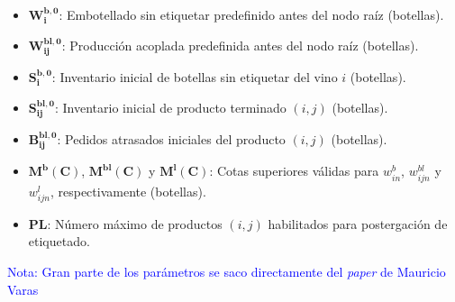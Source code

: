 \documentclass[11pt, letterpaper]{article}
\begin{document}
\begin{itemize}
    \item $\bm{W^{b,0}_i}$: Embotellado sin etiquetar predefinido
    antes del nodo raíz (botellas).
    
    \item $\bm{W^{bl,0}_{ij}}$: Producción acoplada predefinida
    antes del nodo raíz (botellas).
    
    \item $\bm{S^{b,0}_i}$: Inventario inicial de botellas sin etiquetar del vino $i$ (botellas).
    
    \item $\bm{S^{bl,0}_{ij}}$: Inventario inicial de producto
    terminado $(i,j)$ (botellas).
    
    \item $\bm{B^{bl,0}_{ij}}$: Pedidos atrasados iniciales del producto $(i,j)$ (botellas).

    \item $\bm{M^b(C)}$, $\bm{M^{bl}(C)}$ y $\bm{M^l(C)}$: Cotas superiores válidas para $w^b_{in}$, $w^{bl}_{ijn}$ y $w^l_{ijn}$,
    respectivamente (botellas).
    
    \item $\bm{PL}$: Número máximo de productos $(i,j)$ habilitados para postergación de etiquetado.
\end{itemize}

\textcolor{blue}{Nota: Gran parte de los parámetros se saco directamente del \textit{paper} de Mauricio Varas}

\end{document}
